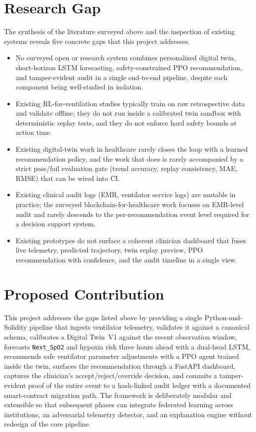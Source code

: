 \documentclass[12pt,a4paper,oneside]{report}
\begin{document}
\section{Research Gap}
The synthesis of the literature surveyed above and the inspection of existing systems reveals five concrete gaps that this project addresses.
\begin{itemize}[leftmargin=*]
  \item No surveyed open or research system combines personalized digital twin, short-horizon LSTM forecasting, safety-constrained PPO recommendation, and tamper-evident audit in a single end-to-end pipeline, despite each component being well-studied in isolation.
  \item Existing RL-for-ventilation studies typically train on raw retrospective data and validate offline; they do not run inside a calibrated twin sandbox with deterministic replay tests, and they do not enforce hard safety bounds at action time.
  \item Existing digital-twin work in healthcare rarely closes the loop with a learned recommendation policy, and the work that does is rarely accompanied by a strict pass/fail evaluation gate (trend accuracy, replay consistency, MAE, RMSE) that can be wired into CI.
  \item Existing clinical audit logs (EMR, ventilator service logs) are mutable in practice; the surveyed blockchain-for-healthcare work focuses on EMR-level audit and rarely descends to the per-recommendation event level required for a decision support system.
  \item Existing prototypes do not surface a coherent clinician dashboard that fuses live telemetry, predicted trajectory, twin replay preview, PPO recommendation with confidence, and the audit timeline in a single view.
\end{itemize}

\section{Proposed Contribution}
This project addresses the gaps listed above by providing a single Python-and-Solidity pipeline that ingests ventilator telemetry, validates it against a canonical schema, calibrates a Digital Twin~V1 against the recent observation window, forecasts \texttt{Next\_SpO2} and hypoxia risk three hours ahead with a dual-head LSTM, recommends safe ventilator parameter adjustments with a PPO agent trained inside the twin, surfaces the recommendation through a FastAPI dashboard, captures the clinician's accept/reject/override decision, and commits a tamper-evident proof of the entire event to a hash-linked audit ledger with a documented smart-contract migration path. The framework is deliberately modular and extensible so that subsequent phases can integrate federated learning across institutions, an adversarial telemetry detector, and an explanation engine without redesign of the core pipeline.
\end{document}
